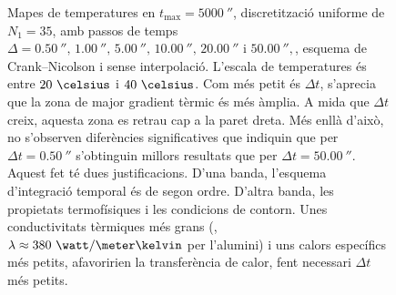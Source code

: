 \begin{figure}[ht]
	\caption{Mapes de temperatures en $t_\text{max} = 5000 \ \second$, discretització uniforme de $N_1 = 35$, amb passos de temps $\Delta = 0.50 \ \second, \, 1.00 \ \second, \, 5.00 \ \second, \, 10.00 \ \second, \, 20.00 \ \second$ i $50.00 \ \second,$, esquema de Crank--Nicolson i sense interpolació. L'escala de temperatures és entre $20 \ \celsius$ i $40 \ \celsius$. Com més petit és $\Delta t$, s'aprecia que la zona de major gradient tèrmic és més àmplia. A mida que $\Delta t$ creix, aquesta zona es retrau cap a la paret dreta. Més enllà d'això, no s'observen diferències significatives que indiquin que per $\Delta t = 0.50 \ \second$ s'obtinguin millors resultats que per $\Delta t = 50.00 \ \second$. Aquest fet té dues justificacions. D'una banda, l'esquema d'integració temporal és de segon ordre. D'altra banda, les propietats termofísiques i les condicions de contorn. Unes conductivitats tèrmiques més grans (\eg, $\lambda \approx 380 \ \watt / \meter \kelvin$ per l'alumini) i uns calors específics més petits, afavoririen la transferència de calor, fent necessari $\Delta t$ més petits.}	
	\label{fig:pas_temps_5000}
\end{figure} 

